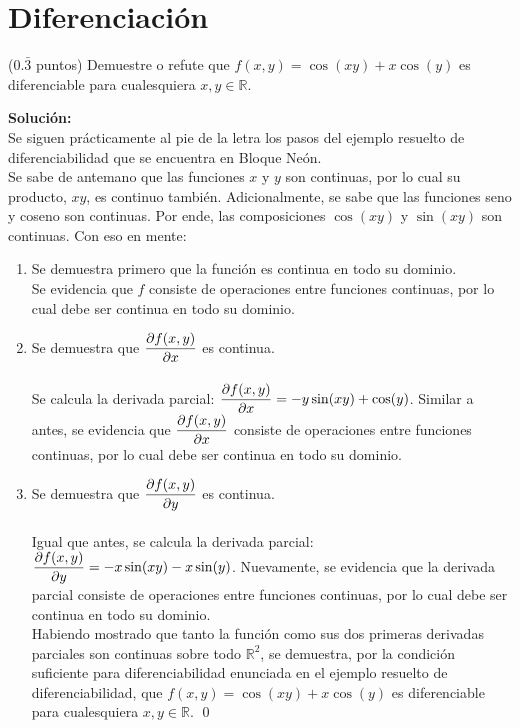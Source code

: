 \documentclass{fmbvecto}
\begin{document}
\section{Diferenciación}

\begin{problema}[Diferenciabilidad]
    (\(0.\bar{3}\) puntos) Demuestre o refute que \(f(x, y) = \cos(xy) +x\cos(y)\) es diferenciable para cualesquiera \(x, y \in \mathbb{R}\).

\vspace{1em}
\tcblower
\textbf{Solución:}\\

Se siguen prácticamente al pie de la letra los pasos del ejemplo resuelto de diferenciabilidad que se encuentra en Bloque Neón. \\

Se sabe de antemano que las funciones \(x\) y \(y\) son continuas, por lo cual su producto, \(xy\), es continuo también. Adicionalmente, se sabe que las funciones seno y coseno son continuas. Por ende, las composiciones \(\cos(xy)\) y \(\sin(xy)\) son continuas. Con eso en mente:\\

\begin{enumerate}
    \item Se demuestra primero que la función es continua en todo su dominio. \\ Se evidencia que \(f\) consiste de operaciones entre funciones continuas, por lo cual debe ser continua en todo su dominio.\\
    
    \item Se demuestra que \(\dparder[f(x, y)]\) es continua. \\\\ Se calcula la derivada parcial: \(\dparder[f(x, y)] = -y\sin(xy) + \cos(y)\). Similar a antes, se evidencia que  \(\dparder[f(x, y)]\) consiste de operaciones entre funciones continuas, por lo cual debe ser continua en todo su dominio.\\
    
    \item Se demuestra que \(\dparder[f(x, y)][y]\) es continua. \\\\  Igual que antes, se calcula la derivada parcial: \(\dparder[f(x, y)][y] =  -x\sin(xy) -x\sin(y) \). Nuevamente, se evidencia que la derivada parcial consiste de operaciones entre funciones continuas, por lo cual debe ser continua en todo su dominio.\\

    Habiendo mostrado que tanto la función como sus dos primeras derivadas parciales son continuas sobre todo \(\mathbb{R}^2\), se demuestra, por la condición suficiente para diferenciabilidad enunciada en el ejemplo resuelto de diferenciabilidad, que \(f(x, y) = \cos(xy) +x\cos(y)\) es diferenciable para cualesquiera \(x, y \in \mathbb{R}\). 
    \qed
\end{enumerate}

\end{problema}
\end{document}
